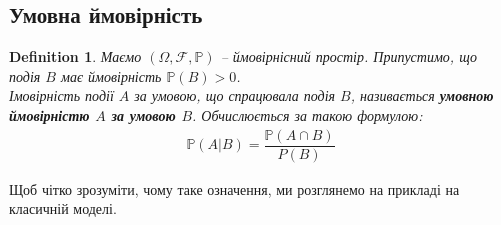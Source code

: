 \documentclass[a4paper, 10pt]{article}
\theoremstyle{theoremdd}
\newtheorem{definition}[theorem]{Definition}
\begin{document}
\subsection{Умовна ймовірність}
\begin{definition}
Маємо $(\Omega, \mathcal{F}, \mathbb{P})$ -- ймовірнісний простір. Припустимо, що подія $B$ має ймовірність $\mathbb{P}(B) > 0$.\\
Імовірність події $A$ за умовою, що спрацювала подія $B$, називається \textbf{умовною ймовірністю $A$ за умовою $B$}. Обчислюється за такою формулою:
\begin{align*}
\mathbb{P}(A|B) = \dfrac{\mathbb{P}(A \cap B)}{P(B)}
\end{align*}
\end{definition}

\noindent
Щоб чітко зрозуміти, чому таке означення, ми розглянемо на прикладі на класичній моделі.
\end{document}
